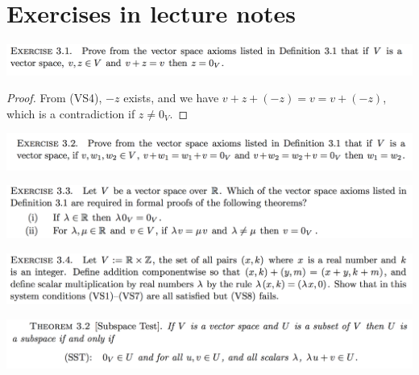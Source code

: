 \documentclass[12pt]{article}
\begin{document}
\section{Exercises in lecture notes}

\begin{mdframed}
  \includegraphics[width=400pt]{img/oxford-prelims-M1-linear-algebra-3-1.png}
\end{mdframed}

\begin{proof}
  From (VS4), $-z$ exists, and we have $v + z + (-z) = v = v + (-z)$, which is a
  contradiction if $z \neq 0_V$.
\end{proof}

\begin{mdframed}
  \includegraphics[width=400pt]{img/oxford-prelims-M1-linear-algebra-3-2.png}
\end{mdframed}

\begin{mdframed}
\includegraphics[width=400pt]{img/oxford-prelims-M1-linear-algebra-3-3.png}
\end{mdframed}

\begin{mdframed}
\includegraphics[width=400pt]{img/oxford-prelims-M1-linear-algebra-3-4.png}
\end{mdframed}

\begin{mdframed}
\includegraphics[width=400pt]{img/oxford-prelims-M1-linear-algebra-thm-3-2.png}
\end{mdframed}
\end{document}
